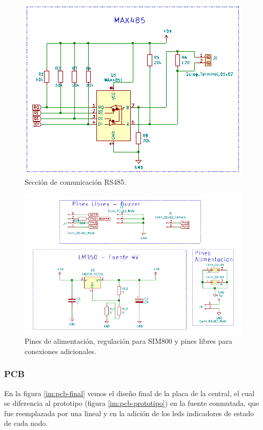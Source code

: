 \begin{figure}[!h]
	\centering
	\includegraphics[scale=.59]{images/central/central-esq-2.png}
    \caption{Sección de comunicación RS485.}
	\label{im:esq-central-2}
\end{figure}

\begin{figure}[!h]
	\centering
	\includegraphics[scale=.55]{images/central/central-esq-3.png}
    \caption{Pines de alimentación, regulación para SIM800 y pines libres para conexiones adicionales.}
	\label{im:esq-central-3}
\end{figure}

\subsubsection{PCB}
En la figura \ref{im:pcb-final} vemos el diseño final de la placa de la central, el cual se diferencia 
al prototipo (figura \ref{im:pcb-prototipo}) en la fuente conmutada, que fue reemplazada por una 
lineal y en la adición de los leds indicadores de estado de cada nodo. 

